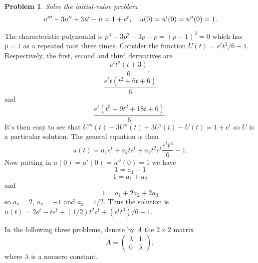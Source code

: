 \documentclass{article}
\newtheorem{problem}{Problem}
\begin{document}
\begin{problem}
Solve the initial-value problem
\[
\begin{tabular}{cc}
$u''' - 3u'' + 3u' - u = 1 + e^t$, & $u(0) = u'(0) = u''(0) = 1$.
\end{tabular}
\]
\end{problem}

The characteristic polynomial is $p^3 - 3p^2 + 3p - p = (p-1)^3 = 0$ which has $p = 1$ as a repeated root three times. Consider the function $U(t) = e^t t^3/6 - 1$. Respectively, the first, second and third derivatives are
\[
\frac{e^t t^2(t+3)}{6},
\]
\[
\frac{e^t t(t^2 + 6t + 6)}{6}
\]
and
\[
\frac{e^t (t^3 + 9t^2 + 18t + 6)}{6}.
\]
It's then easy to see that $U'''(t) - 3U''(t) + 3U'(t) - U(t) = 1 + e^t$ so $U$ is a particular solution. The general equation is then
\[
u(t) = a_1 e^t + a_2 t e^t + a_3 t^2 e^t \frac{e^t t^3}{6} - 1.
\]
Now putting in $u(0) = u'(0) = u''(0) = 1$ we have
\[
1 = a_1 - 1
\]
\[
1 = a_1 + a_2
\]
and
\[
1 = a_1 + 2a_2 + 2a_3
\]
so $a_1 = 2$, $a_2 = -1$ and $a_3 = 1/2$. Thus the solution is $u(t) = 2e^t - te^t + (1/2)t^2e^t + (e^t t^3)/6 - 1$.

\noindent
In the following three problems, denote by $A$ the $2 \times 2$ matrix
\[
A =
\left (
\begin{array}{cc}
\lambda & 1\\
0 & \lambda
\end{array}
\right ),
\]
where $\lambda$ is a nonzero constant.
\end{document}
